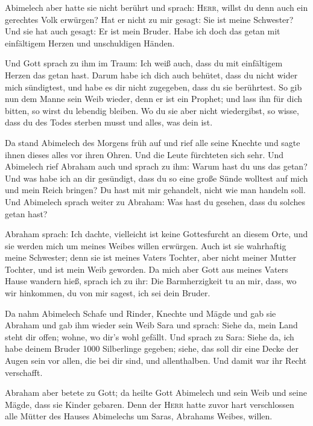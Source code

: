  Abimelech aber hatte sie nicht berührt und sprach:
\textsc{Herr}, willst du denn auch ein gerechtes Volk erwürgen?
 Hat er nicht zu mir gesagt: Sie ist meine Schwester? Und
sie hat auch gesagt: Er ist mein Bruder. Habe ich doch das getan mit
einfältigem Herzen und unschuldigen Händen.

 Und Gott sprach zu ihm im Traum: Ich weiß auch, dass du
mit einfältigem Herzen das getan hast. Darum habe ich dich auch behütet,
dass du nicht wider mich sündigtest, und habe es dir nicht zugegeben,
dass du sie berührtest.  So gib nun dem Manne sein Weib
wieder, denn er ist ein Prophet; und lass ihn für dich bitten, so wirst
du lebendig bleiben. Wo du sie aber nicht wiedergibst, so wisse, dass du
des Todes sterben musst und alles, was dein ist.

 Da stand Abimelech des Morgens früh auf und rief alle
seine Knechte und sagte ihnen dieses alles vor ihren Ohren. Und die
Leute fürchteten sich sehr.  Und Abimelech rief Abraham
auch und sprach zu ihm: Warum hast du uns das getan? Und was habe ich an
dir gesündigt, dass du so eine große Sünde wolltest auf mich und mein
Reich bringen? Du hast mit mir gehandelt, nicht wie man handeln soll.
 Und Abimelech sprach weiter zu Abraham: Was hast du
gesehen, dass du solches getan hast?

 Abraham sprach: Ich dachte, vielleicht ist keine
Gottesfurcht an diesem Orte, und sie werden mich um meines Weibes willen
erwürgen.  Auch ist sie wahrhaftig meine Schwester; denn
sie ist meines Vaters Tochter, aber nicht meiner Mutter Tochter, und ist
mein Weib geworden.  Da mich aber Gott aus meines Vaters
Hause wandern hieß, sprach ich zu ihr: Die Barmherzigkeit tu an mir,
dass, wo wir hinkommen, du von mir sagest, ich sei dein Bruder.

 Da nahm Abimelech Schafe und Rinder, Knechte und Mägde
und gab sie Abraham und gab ihm wieder sein Weib Sara 
und sprach: Siehe da, mein Land steht dir offen; wohne, wo dir's wohl
gefällt.  Und sprach zu Sara: Siehe da, ich habe deinem
Bruder 1000 Silberlinge gegeben; siehe, das soll dir eine Decke der
Augen sein vor allen, die bei dir sind, und allenthalben. Und damit war
ihr Recht verschafft.

 Abraham aber betete zu Gott; da heilte Gott Abimelech
und sein Weib und seine Mägde, dass sie Kinder gebaren. 
Denn der \textsc{Herr} hatte zuvor hart verschlossen alle Mütter des
Hauses Abimelechs um Saras, Abrahams Weibes, willen.

